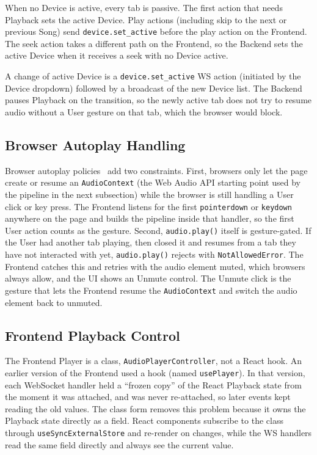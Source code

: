 When no Device is active, every tab is passive. The first action
that needs Playback sets the active Device. Play actions (including
skip to the next or previous Song) send \texttt{device.set\_active}
before the play action on the Frontend. The seek action takes a
different path on the Frontend, so the Backend sets the active
Device when it receives a seek with no Device active.

A change of active Device is a \texttt{device.set\_active} WS action
(initiated by the Device dropdown) followed by a broadcast of the new
Device list. The Backend pauses Playback on the transition, so the
newly active tab does not try to resume audio without a User gesture
on that tab, which the browser would block.

\subsection{Browser Autoplay Handling}
Browser autoplay policies~\parencite{chrome_autoplay} add two constraints. First, browsers only
let the page create or resume an \texttt{AudioContext} (the Web Audio
API starting point used by the pipeline in the next subsection) while
the browser is still handling a User click or key press. The Frontend
listens for the first \texttt{pointerdown} or \texttt{keydown} anywhere
on the page and builds the pipeline inside that handler, so the first
User action counts as the gesture. Second, \texttt{audio.play()} itself
is gesture-gated. If the User had another tab playing, then closed it
and resumes from a tab they have not interacted with yet,
\texttt{audio.play()} rejects with \texttt{NotAllowedError}\@. The
Frontend catches this and retries with the audio element muted, which
browsers always allow, and the UI shows an Unmute control. The Unmute
click is the gesture that lets the Frontend resume the
\texttt{AudioContext} and switch the audio element back to unmuted.

\subsection{Frontend Playback Control}
The Frontend Player is a class, \texttt{AudioPlayerController}, not a
React hook. An earlier version of the Frontend used a hook (named
\texttt{usePlayer}). In that version, each WebSocket handler held a
``frozen copy'' of the React Playback state from the moment it was
attached, and was never re-attached, so later events kept reading the
old values. The class form removes this problem because it owns the
Playback state directly as a field. React components subscribe to the
class through \texttt{useSyncExternalStore} and re-render on changes,
while the WS handlers read the same field directly and always see the
current value.

